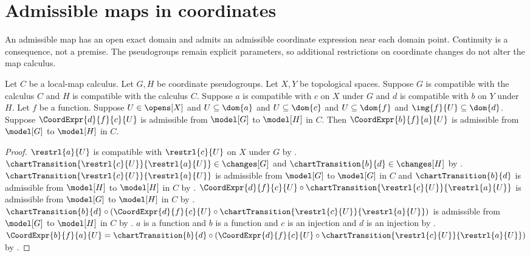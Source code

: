 \section{Admissible maps in coordinates}





An admissible map has an open exact domain and admits an admissible coordinate
expression near each domain point. Continuity is a consequence, not a premise.
The pseudogroups remain explicit parameters, so additional restrictions on
coordinate changes do not alter the map calculus.

\begin{theorem}\label{admissible_coordinate_change}
    Let $C$ be a local-map calculus.
    Let $G,H$ be coordinate pseudogroups.
    Let $X,Y$ be topological spaces.
    Suppose $G$ is compatible with the calculus $C$ and $H$ is compatible with the calculus $C$.
    Suppose $a$ is compatible with $c$ on $X$ under $G$ and
        $d$ is compatible with $b$ on $Y$ under $H$.
    Let $f$ be a function.
    Suppose $U\in\opens[X]$ and $U\subseteq\dom{a}$ and $U\subseteq\dom{c}$ and
        $U\subseteq\dom{f}$ and $\img{f}{U}\subseteq\dom{d}$.
    Suppose $\CoordExpr{d}{f}{c}{U}$ is admissible from $\model[G]$ to $\model[H]$ in $C$.
    Then $\CoordExpr{b}{f}{a}{U}$ is admissible from $\model[G]$ to $\model[H]$ in $C$.
\end{theorem}
\begin{proof}
    $\restrl{a}{U}$ is compatible with $\restrl{c}{U}$ on $X$ under $G$ by
        .
    $\chartTransition{\restrl{c}{U}}{\restrl{a}{U}}\in\changes[G]$ and
        $\chartTransition{b}{d}\in\changes[H]$ by .
    $\chartTransition{\restrl{c}{U}}{\restrl{a}{U}}$ is admissible
        from $\model[G]$ to $\model[G]$ in $C$ and
        $\chartTransition{b}{d}$ is admissible from $\model[H]$ to $\model[H]$ in $C$ by
        .
    $\CoordExpr{d}{f}{c}{U}\circ\chartTransition{\restrl{c}{U}}{\restrl{a}{U}}$
        is admissible from $\model[G]$ to $\model[H]$ in $C$ by
        .
    $\chartTransition{b}{d}\circ
        (\CoordExpr{d}{f}{c}{U}\circ\chartTransition{\restrl{c}{U}}{\restrl{a}{U}})$
        is admissible from $\model[G]$ to $\model[H]$ in $C$ by
        .
    $a$ is a function and $b$ is a function and $c$ is an injection and $d$ is an injection by
        .
    $\CoordExpr{b}{f}{a}{U}=\chartTransition{b}{d}\circ
        (\CoordExpr{d}{f}{c}{U}\circ\chartTransition{\restrl{c}{U}}{\restrl{a}{U}})$ by
        .
\end{proof}

